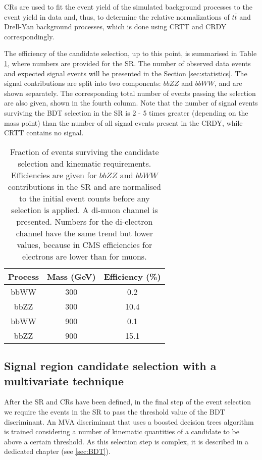 CRs are used to fit the event yield of the simulated background processes to the event yield in data and, thus, to determine the relative normalizations of $t\bar{t}$ and Drell-Yan background processes, which is done using CRTT and CRDY correspondingly. 

The efficiency of the candidate selection, up to this point, is summarised in Table \ref{eff_upto_bdt}, where numbers are provided for the SR. The number of observed data events and expected signal events will be presented in the Section \ref{sec:statistics}. The signal contributions are split into two components: $bbZZ$ and $bbWW$, and are shown separately. The corresponding total number of events passing the selection are also given, shown in the fourth column. Note that the number of signal events surviving the BDT selection in the SR is 2 - 5 times greater (depending on the mass point) than the number of all signal events present in the CRDY, while CRTT contains no signal. 

\begin{table}
\begin{center}
\caption[Fraction of events surviving the candidate selection and kinematic requirements.]{Fraction of events surviving the candidate selection and kinematic requirements. Efficiencies are given for $bbZZ$ and $bbWW$ contributions in the SR and are normalised to the initial event counts before any selection is applied. A di-muon channel is presented. Numbers for the di-electron channel have the same trend but lower values, because in CMS efficiencies for electrons are lower than for muons.}
\begin{tabular}{ |c|c|c| } \hline
{Process} & Mass (GeV) & Efficiency (\%)  \\\hline
bbWW & 300 & 0.2 \\
bbZZ & 300 & 10.4 \\\hline
bbWW & 900 & 0.1 \\
bbZZ & 900 & 15.1 \\\hline
\end{tabular}
\label{eff_upto_bdt}
\end{center}
\end{table}

\subsection{Signal region candidate selection with a multivariate technique}

After the SR and CRs have been defined, in the final step of the event selection we require the events in the SR to pass the threshold value of the BDT discriminant. An MVA discriminant that uses a boosted decision trees algorithm is trained considering a number of kinematic quantities of a candidate to be above a certain threshold. As this selection step is complex, it is described in a dedicated chapter (see \ref{sec:BDT}).

